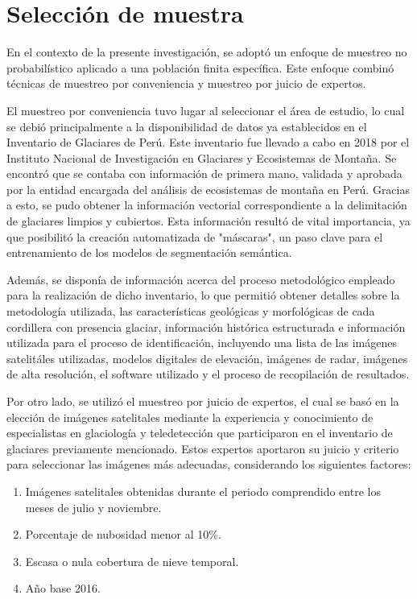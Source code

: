 \section{Selección de muestra}
\label{sec:SeleccionMuestra}

En el contexto de la presente investigación, se adoptó un enfoque de muestreo no probabilístico aplicado a una población finita específica. Este enfoque combinó técnicas de muestreo por conveniencia y muestreo por juicio de expertos.

El muestreo por conveniencia tuvo lugar al seleccionar el área de estudio, lo cual se debió principalmente a la disponibilidad de datos ya establecidos en el Inventario de Glaciares de Perú. Este inventario fue llevado a cabo en 2018 por el Instituto Nacional de Investigación en Glaciares y Ecosistemas de Montaña. Se encontró que se contaba con información de primera mano, validada y aprobada por la entidad encargada del análisis de ecosistemas de montaña en Perú. Gracias a esto, se pudo obtener la información vectorial correspondiente a la delimitación de glaciares limpios y cubiertos. Esta información resultó de vital importancia, ya que posibilitó la creación automatizada de "máscaras", un paso clave para el entrenamiento de los modelos de segmentación semántica.

Además, se disponía de información acerca del proceso metodológico empleado para la realización de dicho inventario, lo que permitió obtener detalles sobre la metodología utilizada, las características geológicas y morfológicas de cada cordillera con presencia glaciar, información histórica estructurada e información utilizada para el proceso de identificación, incluyendo una lista de las imágenes satelitáles utilizadas, modelos digitales de elevación, imágenes de radar, imágenes de alta resolución, el software utilizado y el proceso de recopilación de resultados.

Por otro lado, se utilizó el muestreo por juicio de expertos, el cual se basó en la elección de imágenes satelitales mediante la experiencia y conocimiento de especialistas en glaciología y teledetección que participaron en el inventario de glaciares previamente mencionado. Estos expertos aportaron su juicio y criterio para seleccionar las imágenes más adecuadas, considerando los siguientes factores:

\begin{enumerate} 
    \item Imágenes satelitales obtenidas durante el periodo comprendido entre los meses de julio y noviembre.
    \item Porcentaje de nubosidad menor al 10\%.
    \item Escasa o nula cobertura de nieve temporal.
    \item Año base 2016.
\end{enumerate}

